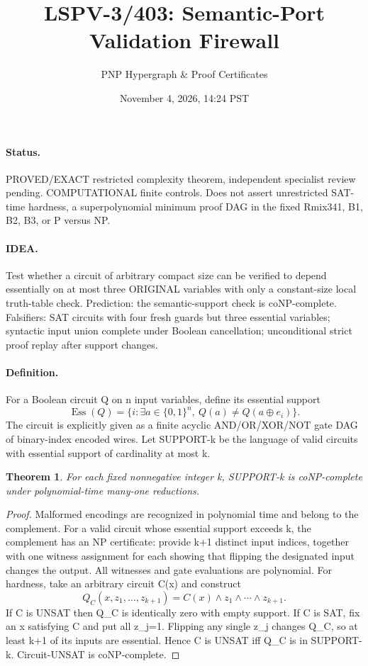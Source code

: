 \documentclass[11pt]{article}
\title{LSPV-3/403: Semantic-Port Validation Firewall}
\author{PNP Hypergraph \& Proof Certificates}
\date{November 4, 2026, 14:24 PST}
\newtheorem{theorem}{Theorem}
\begin{document}
\maketitle
\paragraph{Status.} PROVED/EXACT restricted complexity theorem, independent specialist review pending. COMPUTATIONAL finite controls. Does not assert unrestricted SAT-time hardness, a superpolynomial minimum proof DAG in the fixed Rmix341, B1, B2, B3, or P versus NP.
\paragraph{IDEA.} Test whether a circuit of arbitrary compact size can be verified to depend essentially on at most three ORIGINAL variables with only a constant-size local truth-table check. Prediction: the semantic-support check is coNP-complete. Falsifiers: SAT circuits with four fresh guards but three essential variables; syntactic input union complete under Boolean cancellation; unconditional strict proof replay after support changes.
\paragraph{Definition.} For a Boolean circuit Q on n input variables, define its essential support
\[
\operatorname{Ess}(Q)=\{i:\exists a\in\{0,1\}^n,\ Q(a)\ne Q(a\oplus e_i)\}.
\]
The circuit is explicitly given as a finite acyclic AND/OR/XOR/NOT gate DAG of binary-index encoded wires. Let SUPPORT-k be the language of valid circuits with essential support of cardinality at most k.
\begin{theorem}
For each fixed nonnegative integer k, SUPPORT-k is coNP-complete under polynomial-time many-one reductions.
\end{theorem}
\begin{proof}
Malformed encodings are recognized in polynomial time and belong to the complement. For a valid circuit whose essential support exceeds k, the complement has an NP certificate: provide k+1 distinct input indices, together with one witness assignment for each showing that flipping the designated input changes the output. All witnesses and gate evaluations are polynomial. For hardness, take an arbitrary circuit C(x) and construct
\[
Q_C(x,z_1,\ldots,z_{k+1})=C(x)\wedge z_1\wedge\cdots\wedge z_{k+1}.
\]
If C is UNSAT then Q_C is identically zero with empty support. If C is SAT, fix an x satisfying C and put all z_j=1. Flipping any single z_j changes Q_C, so at least k+1 of its inputs are essential. Hence C is UNSAT iff Q_C is in SUPPORT-k. Circuit-UNSAT is coNP-complete.
\end{proof}
\end{document}
